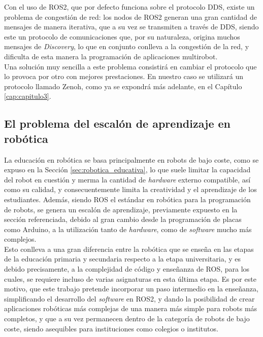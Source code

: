 Con el uso de ROS2, que por defecto funciona sobre el protocolo DDS, existe un
problema de congestión de red: los nodos de ROS2 generan una gran cantidad de
mensajes de manera iterativa, que a su vez se transmiten a través de DDS, siendo
este un protocolo de comunicaciones que, por su naturaleza, origina muchos
mensajes de \textit{Discovery}, lo que en conjunto conlleva a la congestión de
la red, y dificulta de esta manera la programación de aplicaciones multirobot.
\\

Una solución muy sencilla a este problema consistirá en cambiar el protocolo que
lo provoca por otro con mejores prestaciones.
En nuestro caso se utilizará un protocolo llamado Zenoh, como ya se expondrá más
adelante, en el Capítulo \ref{cap:capitulo3}.


\subsection{El problema del escalón de aprendizaje en robótica}
\label{sec:problema_escalon}

La educación en robótica se basa principalmente en robots de bajo coste, como se
expuso en la Sección \ref{sec:robotica_educativa}, lo que suele limitar la
capacidad del robot en cuestión y merma la cantidad de \textit{hardware} externo
compatible, así como su calidad, y consecuentemente limita la creatividad y el
aprendizaje de los estudiantes.
Además, siendo ROS el estándar en robótica para la programación de robots,
se genera un escalón de aprendizaje, previamente expuesto en la sección
referenciada, debido al gran cambio desde la programación de placas como
Arduino, a la utilización tanto de \textit{hardware}, como de \textit{software}
mucho más complejos.
\\

Esto conlleva a una gran diferencia entre la robótica que se enseña en las
etapas de la educación primaria y secundaria respecto a la etapa universitaria,
y es debido precisamente, a la complejidad de código y enseñanza de ROS, para
los cuales, se requiere incluso de varias asignaturas en esta última etapa.
Es por este motivo, que este trabajo pretende incorporar un paso intermedio en
la enseñanza, simplificando el desarrollo del  \textit{software} en ROS2, y
dando la posibilidad de crear aplicaciones robóticas más complejas de una manera
más simple para robots más completos, y que a su vez permanecen dentro de la
categoría de robots de bajo coste, siendo asequibles para instituciones como
colegios o institutos.


